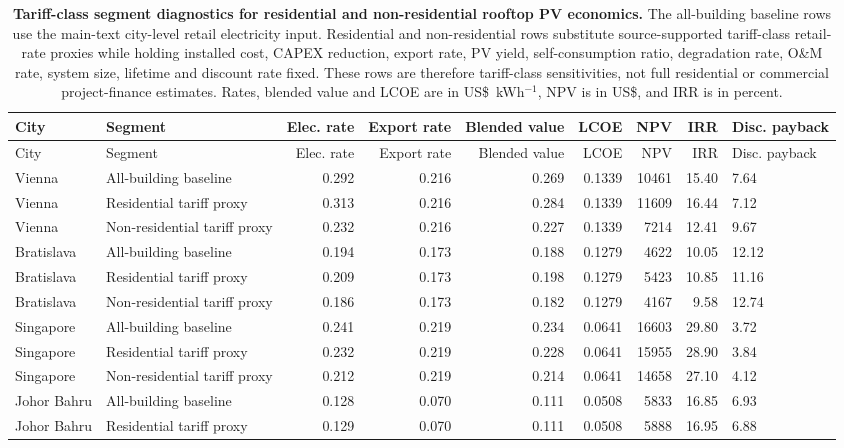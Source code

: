 {\scriptsize
\begin{longtable}{llrrrrrrl}
\caption{\textbf{Tariff-class segment diagnostics for residential and non-residential rooftop PV economics.} The all-building baseline rows use the main-text city-level retail electricity input. Residential and non-residential rows substitute source-supported tariff-class retail-rate proxies while holding installed cost, CAPEX reduction, export rate, PV yield, self-consumption ratio, degradation rate, O\&M rate, system size, lifetime and discount rate fixed. These rows are therefore tariff-class sensitivities, not full residential or commercial project-finance estimates. Rates, blended value and LCOE are in US\$~kWh$^{-1}$, NPV is in US\$, and IRR is in percent.}\label{tab:s_segment_economic_results}\\
\toprule
City & Segment & Elec. rate & Export rate & Blended value & LCOE & NPV & IRR & Disc. payback \\
\midrule
\endfirsthead
\toprule
City & Segment & Elec. rate & Export rate & Blended value & LCOE & NPV & IRR & Disc. payback \\
\midrule
\endhead
Vienna & All-building baseline & 0.292 & 0.216 & 0.269 & 0.1339 & 10461 & 15.40 & 7.64 \\
Vienna & Residential tariff proxy & 0.313 & 0.216 & 0.284 & 0.1339 & 11609 & 16.44 & 7.12 \\
Vienna & Non-residential tariff proxy & 0.232 & 0.216 & 0.227 & 0.1339 & 7214 & 12.41 & 9.67 \\
\midrule
Bratislava & All-building baseline & 0.194 & 0.173 & 0.188 & 0.1279 & 4622 & 10.05 & 12.12 \\
Bratislava & Residential tariff proxy & 0.209 & 0.173 & 0.198 & 0.1279 & 5423 & 10.85 & 11.16 \\
Bratislava & Non-residential tariff proxy & 0.186 & 0.173 & 0.182 & 0.1279 & 4167 & 9.58 & 12.74 \\
\midrule
Singapore & All-building baseline & 0.241 & 0.219 & 0.234 & 0.0641 & 16603 & 29.80 & 3.72 \\
Singapore & Residential tariff proxy & 0.232 & 0.219 & 0.228 & 0.0641 & 15955 & 28.90 & 3.84 \\
Singapore & Non-residential tariff proxy & 0.212 & 0.219 & 0.214 & 0.0641 & 14658 & 27.10 & 4.12 \\
\midrule
Johor Bahru & All-building baseline & 0.128 & 0.070 & 0.111 & 0.0508 & 5833 & 16.85 & 6.93 \\
Johor Bahru & Residential tariff proxy & 0.129 & 0.070 & 0.111 & 0.0508 & 5888 & 16.95 & 6.88 \\

\end{longtable}}
